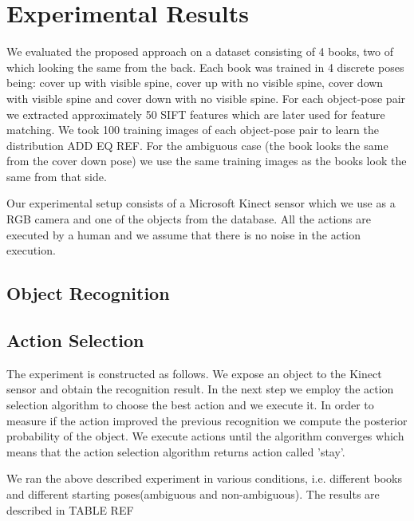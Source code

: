 \documentclass[conference]{IEEEtran}
\begin{document}
\section{Experimental Results}

    We evaluated the proposed approach on a dataset consisting of 4 books, two of which looking the same from the back. Each book was trained in 4 discrete poses being: cover up with visible spine, cover up with no visible spine, cover down with visible spine and cover down with no visible spine. For each object-pose pair we extracted approximately 50 SIFT features which are later used for feature matching. We took 100 training images of each object-pose pair to learn the distribution ADD EQ REF. For the ambiguous case (the book looks the same from the cover down pose) we use the same training images as the books look the same from that side.

    Our experimental setup consists of a Microsoft Kinect sensor which we use as a RGB camera and one of the objects from the database. All the actions are executed by a human and we assume that there is no noise in the action execution. 

    \subsection{Object Recognition}

    \subsection{Action Selection}
        The experiment is constructed as follows. We expose an object to the Kinect sensor and obtain the recognition result. In the next step we employ the action selection algorithm to choose the best action and we execute it. In order to measure if the action improved the previous recognition we compute the posterior probability of the object. We execute actions until the algorithm converges which means that the action selection algorithm returns action called 'stay'.

        We ran the above described experiment in various conditions, i.e. different books and different starting poses(ambiguous and non-ambiguous). The results are described in TABLE REF


\end{document}
